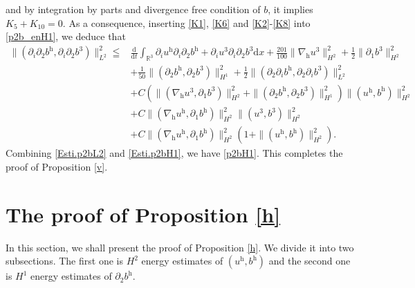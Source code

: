 \documentclass[11pt]{amsart}
\theoremstyle{definition}
\newcommand{\R}{\mathbb{R}}
\newcommand{\h}{\mathrm{h}}
\newcommand{\nablah}{\nabla_{\mathrm{h}}}
\numberwithin{equation}{section}
\begin{document}
and by integration by parts and divergence free condition of $b$, it implies $K_5+K_{10} = 0$. As a consequence, inserting \eqref{K1}, \eqref{K6} and \eqref{K2}-\eqref{K8} into \eqref{p2b_enH1}, we deduce that
\begin{align}\label{Esti.p2bH1}
	\|(\partial_i\partial_2b^\h,\partial_i\partial_2b^3)\|_{L^2}^2\leqq &\frac{\mathrm{d}}{\mathrm{d}t}\int_{\R^3}\partial_{i}u^\h\partial_{i}\partial_{2}b^\h+\partial_{i}u^3\partial_{i}\partial_{2}b^3\mathrm{d}x+\frac{201}{100}\|\nablah u^3\|_{H^2}^2+\frac12\|\partial_1b^3\|_{H^2}^2\nonumber\\
	&+\frac{1}{50}\|(\partial_{2}b^\h,\partial_{2}b^3)\|_{H^1}^2+\frac12\|(\partial_2\partial_{i}b^\h,\partial_2\partial_{i}b^3)\|_{L^2}^2\nonumber\\
	&+C\left(\|(\nablah u^3,\partial_1b^3)\|_{H^2}^2+\|(\partial_2b^\mathrm{h},\partial_2b^3)\|_{H^{1}}^2\right)\|(u^\h,b^\h)\|_{H^{2}}^2\nonumber\\
	&+C\|(\nablah u^\h,\partial_1b^\h)\|_{H^{2}}^2\|(u^3,b^3)\|_{H^2}^2\nonumber\\
	&+C\|(\nablah u^\h,\partial_{1}b^\h)\|_{H^{2}}^2\left(1+\|( u^\h, b^\h)\|_{H^2}^2\right).
\end{align}
Combining \eqref{Esti.p2bL2} and \eqref{Esti.p2bH1}, we have \eqref{p2bH1}. This completes the proof of Proposition \ref{v}.

\section{The proof of Proposition \ref{h}}\label{4}
In this section, we shall present the proof of Proposition \ref{h}. We divide it into two subsections. The first
one is $H^2$ energy estimates of $(u^\h, b^\h)$ and the second one is $H^1$ energy estimates of $\partial_2b^\h$.
\end{document}
